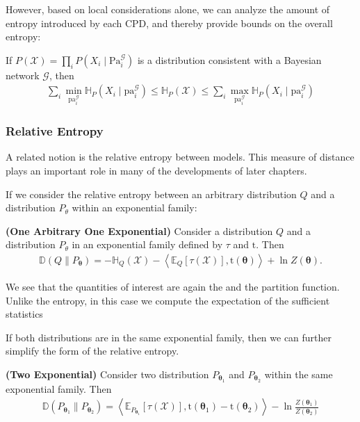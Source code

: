 \documentclass{article}
\newcommand{\bfs}[1]{\textbf{({#1}) }}
\begin{document}
However, based on local considerations alone, we can analyze the amount of entropy introduced by each CPD, and thereby provide bounds on the overall entropy:
\begin{cora}
 If $P(\mathcal{X})=\prod_{i} P\left(X_{i} \mid \mathrm{Pa}_{i}^{\mathcal{G}}\right)$ is a distribution consistent with a Bayesian network $\mathcal{G}$, then
\begin{align*}
\sum_{i} \min _{\mathrm{pa}_{i}^{\mathcal{G}}} \mathbb{H}_{P}\left(X_{i} \mid \mathrm{pa}_{i}^{\mathcal{G}}\right) \leq \mathbb{H}_{P}(\mathcal{X}) \leq \sum_{i} \max _{\mathrm{pa}_{i}^{\mathcal{G}}} \mathbb{H}_{P}\left(X_{i} \mid \mathrm{pa}_{i}^{\mathcal{G}}\right)
\end{align*}
\end{cora}
\subsubsection{Relative Entropy}

A related notion is the relative entropy between models. This measure of distance plays an important role in many of the developments of later chapters.

If we consider the relative entropy between an arbitrary distribution $Q$ and a distribution $P_{\theta}$ within an exponential family:
\begin{thma}\bfs{One Arbitrary One Exponential}
Consider a distribution $Q$ and a distribution $P_{\theta}$ in an exponential family defined by $\tau$ and $\mathrm{t}$. Then
\begin{align*}
\mathbb{D}\left(Q \| P_{\boldsymbol{\theta}}\right)=-\mathbb{H}_{Q}(\mathcal{X})-\left\langle\mathbb{E}_{Q}[\tau(\mathcal{X})], \mathrm{t}(\boldsymbol{\theta})\right\rangle+\ln Z(\boldsymbol{\theta}) .
\end{align*}
\end{thma}
\begin{rema}
We see that the quantities of interest are again the  and the partition function. Unlike the entropy, in this case we compute the expectation of the sufficient statistics 
\end{rema}


If both distributions are in the same exponential family, then we can further simplify the form of the relative entropy.
\begin{thma}\bfs{Two Exponential}
Consider two distribution $P_{\boldsymbol{\theta}_{1}}$ and $P_{\boldsymbol{\theta}_{2}}$ within the same exponential family. Then
\begin{align*}
\mathbb{D}\left(P_{\boldsymbol{\theta}_{1}} \| P_{\boldsymbol{\theta}_{2}}\right)=\left\langle\mathbb{E}_{P_{\boldsymbol{\theta}_{1}}}[\tau(\mathcal{X})], \mathrm{t}\left(\boldsymbol{\theta}_{1}\right)-\mathrm{t}\left(\boldsymbol{\theta}_{2}\right)\right\rangle-\ln \frac{Z\left(\boldsymbol{\theta}_{1}\right)}{Z\left(\boldsymbol{\theta}_{2}\right)}
\end{align*}
\end{thma}
\end{document}
